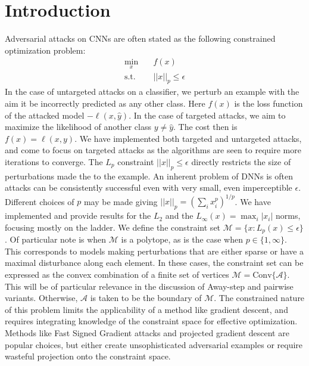 \documentclass{article}
\begin{document}
\section{Introduction}
Adversarial attacks on CNNs are often stated as the following constrained optimization problem:
\begin{equation}
\begin{aligned}
\min_x \quad & f(x)\\
\text{s.t.} \quad & ||x||_p \leq \epsilon
\end{aligned}
\end{equation}
In the case of untargeted attacks on a classifier, we perturb an example with the aim it be incorrectly predicted as any other class. Here $f(x)$ is the loss function of the attacked model $-\ell(x, \hat{y})$. In the case of targeted attacks, we aim to maximize the likelihood of another class $y \neq \hat{y}$. The cost then is $f(x) = \ell(x, y)$. We have implemented both targeted and untargeted attacks, and come to focus on targeted attacks as the algorithms are seen to require more iterations to converge. 
The $L_p$ constraint $||x||_p \leq \epsilon$ directly restricts the size of perturbations made the to the example. An inherent problem of DNNs is often attacks can be consistently successful even with very small, even imperceptible $\epsilon$. Different choices of $p$ may be made giving $||x||_p = (\sum_i{x_i^p})^{1/p}$. We have implemented and provide results for the $L_2$ and the $L_\infty(x) = \max_i |x_i|$ norms, focusing mostly on the ladder. 
We define the constraint set $\mathcal{M} = \{x : L_p(x) \leq \epsilon\}$. 
Of particular note is when $\mathcal{M}$ is a polytope, as is the case when $p \in \{1, \infty\}$. This corresponds to models making perturbations that are either sparse or have a maximal disturbance along each element. In these cases, the constraint set can be expressed as the convex combination of a finite set of vertices $\mathcal{M} = \text{Conv}\{\mathcal{A}\}$. This will be of particular relevance in the discussion of Away-step and pairwise variants. Otherwise, $\mathcal{A}$ is taken to be the boundary of $\mathcal{M}$.\break
The constrained nature of this problem limits the applicability of a method like gradient descent, and requires integrating knowledge of the constraint space for effective optimization. Methods like Fast Signed Gradient attacks and projected gradient descent are popular choices, but either create unsophisticated adversarial examples or require wasteful projection onto the constraint space. 
\end{document}
